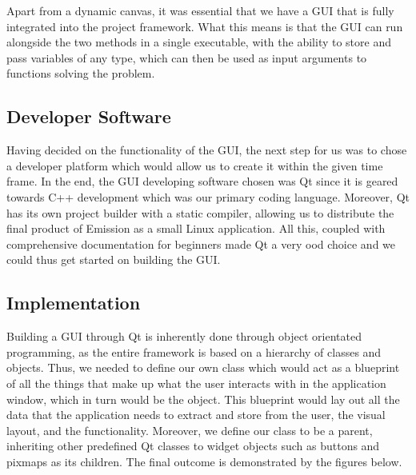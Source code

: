 \documentclass[a4paper]{article}
\begin{document}
Apart from a dynamic canvas, it was essential that we have a GUI that is fully 
integrated into the project framework. What this means is that the GUI can run 
alongside the two methods in a single executable, with the ability to store and 
pass variables of any type, which can then be used as input arguments to 
functions solving the problem. 

\subsection*{Developer Software}
Having decided on the functionality of the GUI, the next step for us was to 
chose a developer platform which would allow us to create it within the given 
time frame. In the end, the GUI developing software chosen was Qt since it is 
geared towards C++ development which was our primary coding language. Moreover, 
Qt has its own project builder with a static compiler, allowing us to 
distribute the final product of Emission as a small Linux application. All 
this, coupled with comprehensive documentation for beginners made Qt a very 
ood choice and we could thus get started on building the GUI.

\subsection*{Implementation}

Building a GUI through Qt is inherently done through object orientated 
programming, as the entire framework is based on a hierarchy of classes and 
objects. Thus, we needed to define our own class which would act as a blueprint 
of all the things that make up what the user interacts with in the application 
window, which in turn would be the object. This blueprint would lay out all the 
data that the application needs to extract and store from the user, the visual 
layout, and the functionality. Moreover, we define our class to be a parent, 
inheriting other predefined Qt classes to widget objects such as buttons and 
pixmaps as its children. The final outcome is demonstrated by the figures 
below.
\end{document}
